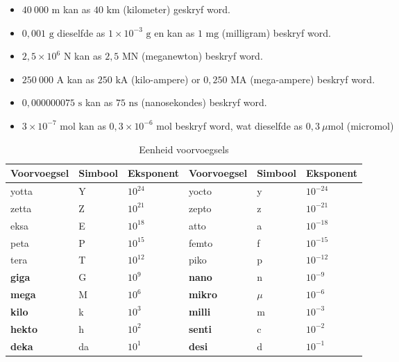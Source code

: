 \begin{itemize}[noitemsep]
  \item $40~000 \text{ m}$ kan as $40 \text{ km}$ (kilometer) geskryf word.
  \item $0,001 \text{ g}$ dieselfde as $1 \times{10}^{-3} \text{ g}$ en kan as $1 \text{ mg}$ (milligram) beskryf word.
  \item $2,5 \times {10}^{6}$ N kan as $2,5 \text{ MN}$ (meganewton) beskryf word.
  \item $250~000 \text{ A}$ kan as $250 \text{ kA}$ (kilo-ampere) or $0,250 \text{ MA}$ (mega-ampere) beskryf word.
  \item $0,000000075 \text{ s}$ kan as $75 \text{ ns}$ (nanosekondes) beskryf word.
  \item $3 \times{10}^{-7} \text{ mol}$ kan as $0,3 \times{10}^{-6} \text{ mol}$ beskryf word, wat dieselfde as $0,3 ~\mu \text{mol}$ (micromol)
\end{itemize}
\begin{table}[H]
        \begin{center}
    \noindent
      \begin{tabular}{|l|l|l|l|l|l|}\hline
\textbf{Voorvoegsel} & \textbf{Simbool}  & \textbf{Eksponent} & \textbf{Voorvoegsel} & \textbf{Simbool} & \textbf{Eksponent} \\ \hline
yotta           & Y                & ${10}^{24}$       & yocto           & y               & ${10}^{-24}$      \\ \hline
zetta           &  Z               & ${10}^{21}$       &  zepto          & z               & ${10}^{-21}$      \\ \hline
eksa             &  E               & ${10}^{18}$       & atto            & a               & ${10}^{-18}$      \\ \hline
peta            & P                & ${10}^{15}$       & femto           & f               & ${10}^{-15}$      \\ \hline
tera            &  T               & ${10}^{12}$       &  piko           & p               & ${10}^{-12}$      \\ \hline
\textbf{giga}   & G                & ${10}^{9}$        & \textbf{nano}   & n               & ${10}^{-9}$       \\ \hline
\textbf{mega}   &  M               & ${10}^{6}$        & \textbf{mikro}  & $\mu $          & ${10}^{-6}$       \\ \hline
\textbf{kilo}   &  k               & ${10}^{3}$        & \textbf{milli}  & m               & ${10}^{-3}$       \\ \hline
\textbf{hekto}  &  h               & ${10}^{2}$        & \textbf{senti}  & c               & ${10}^{-2}$       \\ \hline
\textbf{deka}   &  da              & ${10}^{1}$        & \textbf{desi}   & d               & ${10}^{-1}$       \\ \hline
    \end{tabular}
\caption{Eenheid voorvoegsels}
      \end{center}
\label{tab:unitprefixes}
\end{table}
